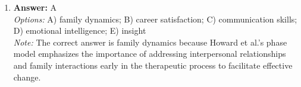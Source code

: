 \documentclass[12pt]{article}
\begin{document}
\begin{enumerate}[label=\arabic*.]
\\ \textit{Note:} The correct answer is based on the bystander effect, which posits that individuals are less likely to offer help in an emergency when others are present due to diffusion of responsibility, making it more likely for someone to assist when they are alone.
\item \textbf{Answer:} A
\\ \textit{Options:} A) family dynamics; B) career satisfaction; C) communication skills; D) emotional intelligence; E) insight
\\ \textit{Note:} The correct answer is family dynamics because Howard et al.'s phase model emphasizes the importance of addressing interpersonal relationships and family interactions early in the therapeutic process to facilitate effective change.
\end{enumerate}
\end{document}
